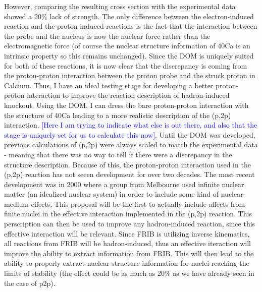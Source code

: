 \documentclass[12pt]{article}
\begin{document}
However, comparing the resulting cross section with the experimental data showed a 20\% lack of strength. The only difference between the electron-induced reaction and the
proton-induced reactions is the fact that the interaction between the probe and the nucleus is now the nuclear force rather than the electromagnetic force (of course the nuclear
structure information of 40Ca is an intrinsic property so this remains unchanged). Since the DOM is uniquely suited for both of these reactions, it is now clear that the
discrepancy is coming from the proton-proton interaction between the proton probe and the struck proton in Calcium. Thus, I have an ideal testing stage for developing a better
proton-proton interaction to improve the reaction description of hadron-induced knockout. Using the DOM, I can dress the bare proton-proton interaction with the structure of 40Ca
leading to a more realistic description of the (p,2p) interaction. \textcolor{blue}{[Here I am trying to indicate what else is out there, and also that the stage is uniquely set for us to calculate
this now].} Until the DOM was developed, previous calculations of (p,2p) were always scaled to match the experimental data -
meaning that there was no way to tell if there were a discrepancy in the structure description. Because of this, the proton-proton interaction used in the (p,2p) reaction has not
seeen development for over two decades. The most recent development was in 2000 where a group from Melbourne used infinite nuclear matter (an idealized nuclear system) in order to
include some kind of nuclear-medium effects. This proposal will be the first to actually include affects from finite nuclei in the effective interaction implemented in the (p,2p)
reaction.  This perscription can then be used to improve any hadron-induced reaction, since this effective interaction will
be relevant. Since FRIB is utilizing inverse kinematics, all reactions from FRIB will be hadron-induced, thus an effective iteraction will improve the ability to extract
information from FRIB. This will then lead to the ability to properly extract nuclear structure information for nuclei reaching the limits of stability (the effect could be as much
as 20\% as we have already seen in the case of p2p). 
\end{document}
